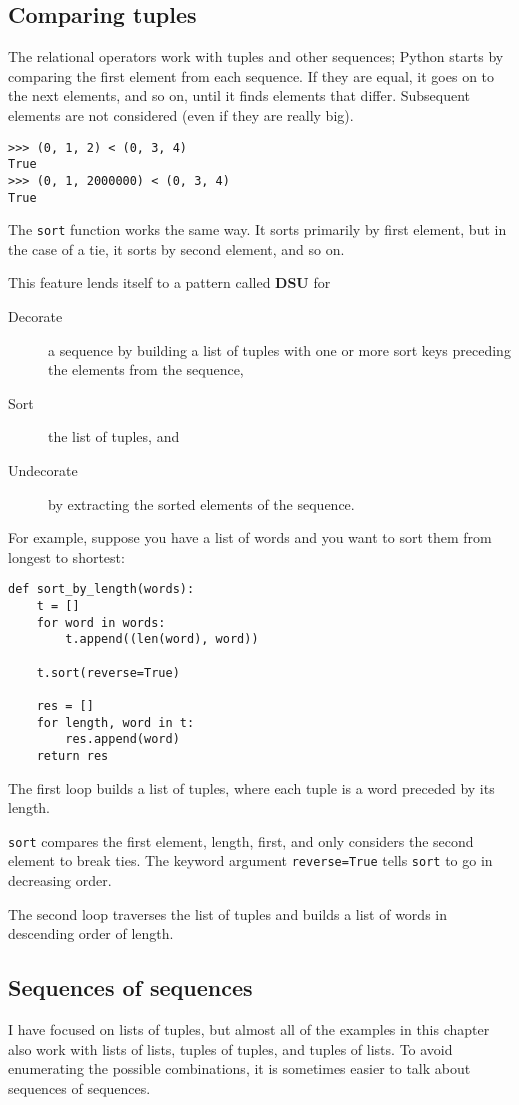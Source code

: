 \documentclass{article}
\begin{document}
\subsection{Comparing tuples}
The relational operators work with tuples and other sequences; Python
starts by comparing the first element from each sequence. If they are
equal, it goes on to the next elements, and so on, until it finds
elements that differ. Subsequent elements are not considered (even if
they are really big).
\begin{verbatim}
>>> (0, 1, 2) < (0, 3, 4)
True
>>> (0, 1, 2000000) < (0, 3, 4)
True
\end{verbatim}
The \verb|sort| function works the same way. It sorts primarily by first
element, but in the case of a tie, it sorts by second element, and so
on.

This feature lends itself to a pattern called \textbf{DSU} for
\begin{description}
    \item [Decorate] a sequence by building a list of tuples with
        one or more sort keys preceding the elements from the
        sequence,
    \item [Sort] the list of tuples, and
    \item [Undecorate] by extracting the sorted elements of the
        sequence.
\end{description}
For example, suppose you have a list of words and you want to sort
them from longest to shortest:
\begin{verbatim}
def sort_by_length(words):
    t = []
    for word in words:
        t.append((len(word), word))

    t.sort(reverse=True)

    res = []
    for length, word in t:
        res.append(word)
    return res
\end{verbatim}
The first loop builds a list of tuples, where each tuple is a word
preceded by its length.

\verb|sort| compares the first element, length, first, and only considers the
second element to break ties. The keyword argument \verb|reverse=True| tells
\verb|sort| to go in decreasing order.

The second loop traverses the list of tuples and builds a list of
words in descending order of length.

\subsection{Sequences of sequences}
I have focused on lists of tuples, but almost all of the examples in
this chapter also work with lists of lists, tuples of tuples, and
tuples of lists. To avoid enumerating the possible combinations, it is
sometimes easier to talk about sequences of sequences.
\end{document}
